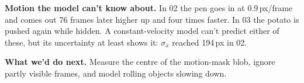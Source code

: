 \documentclass[conference]{assets/latex/IEEEtran}
\begin{document}
\textbf{Motion the model can't know about.} In 02 the pen goes in at
0.9\,px/frame and comes out 76 frames later higher up and four times faster.
In 03 the potato is pushed again while hidden. A constant-velocity model
can't predict either of these, but its uncertainty at least shows it:
$\sigma_x$ reached 194\,px in 02.

\textbf{What we'd do next.} Measure the centre of the motion-mask blob,
ignore partly visible frames, and model rolling objects slowing down.

\nocite{foundationsCVbook}
\printbibliography
\end{document}
